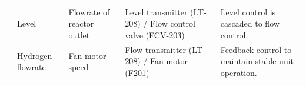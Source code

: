 \begin{table}[h]
{\begin{tabular}{p{3cm}|p{3cm}|p{4cm}|p{5cm}|p{6cm}}
                                            & Level                                       & Flowrate of reactor outlet                              & Level transmitter (LT-208) / Flow control valve (FCV-203)                  & Level control is cascaded to flow control.                                                                                           \\
                                                                                        & Hydrogen flowrate                                     & Fan motor speed                              & Flow transmitter (LT-208) / Fan motor (F201)                  & Feedback control to maintain stable unit operation.                                                                                           \\
                                                                   

\end{tabular}}
\end{table}
